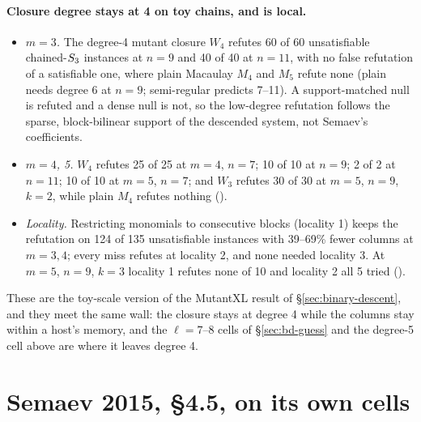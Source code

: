 \paragraph{Closure degree stays at 4 on toy chains, and is local.}
\begin{itemize}
\item \emph{$m=3$.} The degree-4 mutant closure $W_4$ refutes 60 of 60
  unsatisfiable chained-$S_{3}$ instances at $n=9$ and 40 of 40 at $n=11$,
  with no false refutation of a satisfiable one, where plain Macaulay $M_4$
  and $M_5$ refute none (plain needs degree 6 at $n=9$; semi-regular
  predicts 7--11). A support-matched null is refuted and a dense null is
  not, so the low-degree refutation follows the sparse, block-bilinear
  support of the descended system, not Semaev's coefficients.
\item \emph{$m=4$, 5.} $W_4$ refutes 25 of 25 at $m=4$, $n=7$; 10 of 10 at
  $n=9$; 2 of 2 at $n=11$; 10 of 10 at $m=5$, $n=7$; and $W_3$ refutes 30
  of 30 at $m=5$, $n=9$, $k=2$, while plain $M_4$ refutes nothing
  ().
\item \emph{Locality.} Restricting monomials to consecutive blocks
  (locality 1) keeps the refutation on 124 of 135 unsatisfiable instances
  with 39--69\% fewer columns at $m=3,4$; every miss refutes at locality 2,
  and none needed locality 3. At $m=5$, $n=9$, $k=3$ locality 1 refutes none
  of 10 and locality 2 all 5 tried
  ().
\end{itemize}
These are the toy-scale version of the MutantXL result of
\S\ref{sec:binary-descent}, and they meet the same wall: the closure stays at
degree 4 while the columns stay within a host's memory, and the
$\ell=7$--8 cells of \S\ref{sec:bd-guess} and the degree-5 cell above are
where it leaves degree 4.

\section{Semaev 2015, \S4.5, on its own cells}\label{sec:bd-semaev}

